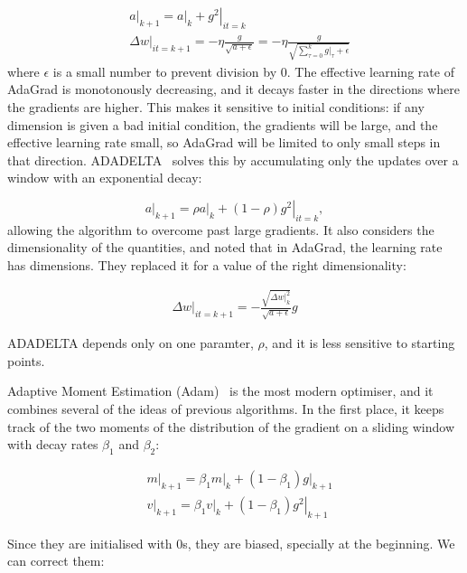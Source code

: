 \begin{align*}
&\left.a\right|_{k+1} = \left. a\right|_{k} + \left.g^2\right|_{it=k}\\
&\left.\Delta w\right|_{it=k+1} = - \eta\frac{g}{\sqrt{a + \epsilon}} =  - \eta\frac{g}{\sqrt{\sum_{\tau=0}^{k} \left.g\right|_\tau + \epsilon}}
\end{align*}
where $\epsilon$ is a small number to prevent division by 0.
The effective learning rate of AdaGrad is monotonously decreasing, and it decays faster in the directions where the gradients are higher.
This makes it sensitive to initial conditions: if any dimension is given a bad initial condition, the gradients will be large, and the effective learning rate small, so AdaGrad will be limited to only small steps in that direction.
ADADELTA~\citep{adadelta} solves this by accumulating only the updates over a window with an exponential decay:

\begin{equation*}
\left.a\right|_{k+1} = \rho \left. a\right|_{k} + (1-\rho) \left.g^2\right|_{it=k},
\end{equation*}
allowing the algorithm to overcome past large gradients.
It also considers the dimensionality of the quantities, and noted that in AdaGrad, the learning rate has dimensions.
They replaced it for a value of the right dimensionality:

\begin{align*}
\left.\Delta w\right|_{it=k+1} = - \frac{\sqrt{\left.\Delta w\right|_{k}^2}}{\sqrt{a + \epsilon}}g 
\end{align*}

ADADELTA depends only on one paramter, $\rho$, and it is less sensitive to starting points.

Adaptive Moment Estimation (Adam)~\citep{adam}
is the most modern optimiser, and it combines several of the ideas of previous algorithms.
In the first place, it keeps track of the two moments of the distribution of the gradient on a sliding window with decay rates $\beta_1$ and $\beta_2$:

\begin{align*}
&\left.m\right|_{k+1} = \beta_1 \left.m\right|_k + (1-\beta_1) \left.g\right|_{k+1}\\
&\left.v\right|_{k+1} = \beta_1 \left.v\right|_k + (1-\beta_1) \left.g^2\right|_{k+1}
\end{align*}

Since they are initialised with 0s, they are biased, specially at the beginning. We can correct them:

